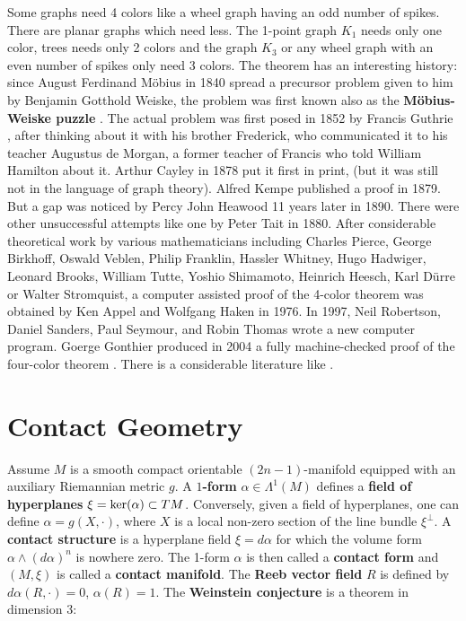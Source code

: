 \documentclass[12pt]{amsart}
\begin{document}
Some graphs need 4 colors like a wheel graph having an odd number of spikes.
There are planar graphs which need less. The 1-point graph $K_1$ needs only one color, 
trees needs only 2 colors and the graph $K_3$ or any wheel graph with an even number
of spikes only need 3 colors. The theorem has an interesting history: 
since August Ferdinand M\"obius in 1840 spread a precursor problem given to him by Benjamin Gotthold Weiske, 
the problem was first known also as the {\bf M\"obius-Weiske puzzle} \cite{Soifer}. The actual problem was first posed
in 1852 by Francis Guthrie \cite{MaritzMouton}, after thinking about it with his brother Frederick, 
who communicated it to his teacher Augustus de Morgan, a former teacher of Francis who told
William Hamilton about it. Arthur Cayley in 1878 put it first in print, (but it was still not in the language of graph theory).
Alfred Kempe published a proof in 1879. But a gap was noticed by
Percy John Heawood 11 years later in 1890. There were other unsuccessful attempts like one by Peter Tait in 1880.
After considerable theoretical work by various mathematicians including Charles Pierce, 
George Birkhoff, Oswald Veblen, Philip Franklin, Hassler Whitney, Hugo Hadwiger, Leonard Brooks, 
William Tutte, Yoshio Shimamoto, Heinrich Heesch, Karl D\"urre or Walter Stromquist,
a computer assisted proof of the 4-color theorem was obtained by Ken Appel and Wolfgang Haken
in 1976. In 1997, Neil Robertson, Daniel Sanders, Paul Seymour, and Robin Thomas wrote a new computer
program.  Goerge Gonthier produced in 2004 a fully machine-checked proof of the four-color theorem \cite{RobinWilson}. 
There is a considerable literature like \cite{Ore,Heesch,FritschFritsch,SaatyKainen,ChartrandZhang2,RobinWilson}. 

\section{Contact Geometry}

Assume $M$ is a smooth compact orientable $(2n-1)$-manifold equipped with an auxiliary Riemannian metric $g$.
A {\bf $1$-form} $\alpha \in \Lambda^1(M)$ defines a {\bf field of hyperplanes} $\xi = {\rm ker}(\alpha) \subset TM$.
Conversely, given a field of hyperplanes, one can define $\alpha = g(X,\cdot)$, where
$X$ is a local non-zero section of the line bundle $\xi^{\perp}$.
A {\bf contact structure} is a hyperplane field $\xi=d\alpha$ for which the volume form
$\alpha \wedge (d\alpha)^n$ is nowhere zero. The 1-form $\alpha$ is then called
a {\bf contact form} and $(M,\xi)$ is called a {\bf contact manifold}. The {\bf Reeb vector field}
$R$ is defined by $d\alpha(R,\cdot)=0$, $\alpha(R)=1$. The {\bf Weinstein conjecture} is a theorem
in dimension 3:
\end{document}
